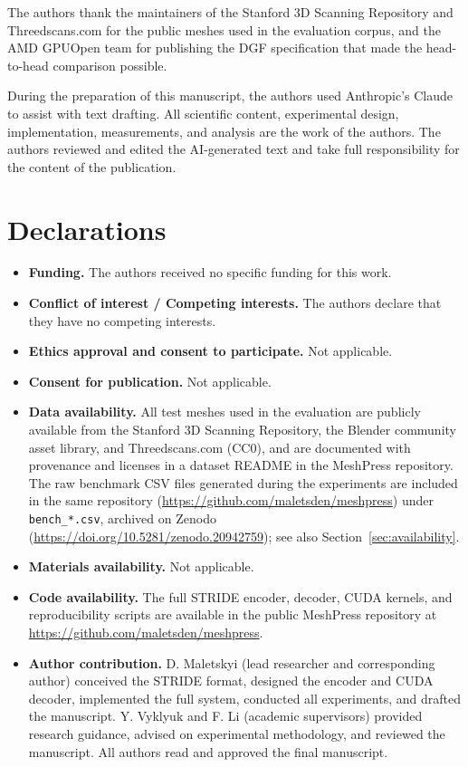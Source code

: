 \documentclass[pdflatex,sn-vancouver-num]{sn-jnl}%
\theoremstyle{thmstyleone}%
\theoremstyle{thmstyletwo}%
\theoremstyle{thmstylethree}%
\begin{document}
\backmatter

The authors thank the maintainers of the Stanford 3D Scanning Repository and Threedscans.com for the public meshes used in the evaluation corpus, and the AMD GPUOpen team for publishing the DGF specification that made the head-to-head comparison possible.

During the preparation of this manuscript, the authors used Anthropic's Claude to assist with text drafting. All scientific content, experimental design, implementation, measurements, and analysis are the work of the authors. The authors reviewed and edited the AI-generated text and take full responsibility for the content of the publication.

\section*{Declarations}

\begin{itemize}
\item \textbf{Funding.} The authors received no specific funding for this work.
\item \textbf{Conflict of interest / Competing interests.} The authors declare that they have no competing interests.
\item \textbf{Ethics approval and consent to participate.} Not applicable.
\item \textbf{Consent for publication.} Not applicable.
\item \textbf{Data availability.} All test meshes used in the evaluation are publicly available from the Stanford 3D Scanning Repository, the Blender community asset library, and Threedscans.com (CC0), and are documented with provenance and licenses in a dataset README in the MeshPress repository. The raw benchmark CSV files generated during the experiments are included in the same repository (\url{https://github.com/maletsden/meshpress}) under \texttt{bench\_*.csv}, archived on Zenodo (\url{https://doi.org/10.5281/zenodo.20942759}); see also Section~\ref{sec:availability}.
\item \textbf{Materials availability.} Not applicable.
\item \textbf{Code availability.} The full STRIDE encoder, decoder, CUDA kernels, and reproducibility scripts are available in the public MeshPress repository at \url{https://github.com/maletsden/meshpress}.
\item \textbf{Author contribution.} D. Maletskyi (lead researcher and corresponding author) conceived the STRIDE format, designed the encoder and CUDA decoder, implemented the full system, conducted all experiments, and drafted the manuscript. Y. Vyklyuk and F. Li (academic supervisors) provided research guidance, advised on experimental methodology, and reviewed the manuscript. All authors read and approved the final manuscript.
\end{itemize}


\end{document}
